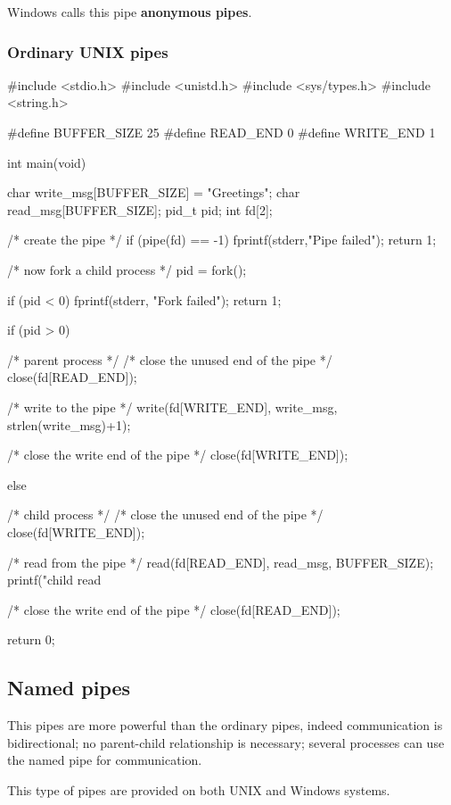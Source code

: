 Windows calls this pipe \textbf{anonymous pipes}.

\newpage
\subsubsection{Ordinary UNIX pipes}
\begin{codeInC}
#include <stdio.h>
#include <unistd.h>
#include <sys/types.h>
#include <string.h>

#define BUFFER_SIZE 25
#define READ_END	0
#define WRITE_END	1

int main(void){
	char write_msg[BUFFER_SIZE] = "Greetings";
	char read_msg[BUFFER_SIZE];
	pid_t pid;
	int fd[2];

	/* create the pipe */
	if (pipe(fd) == -1) {
		fprintf(stderr,"Pipe failed");
		return 1;
	}

	/* now fork a child process */
	pid = fork();

	if (pid < 0) {
		fprintf(stderr, "Fork failed");
		return 1;
	}

	if (pid > 0) {  /* parent process */
		/* close the unused end of the pipe */
		close(fd[READ_END]);

		/* write to the pipe */
		write(fd[WRITE_END], write_msg, strlen(write_msg)+1); 

		/* close the write end of the pipe */
		close(fd[WRITE_END]);
	}
	else { /* child process */
		/* close the unused end of the pipe */
		close(fd[WRITE_END]);

		/* read from the pipe */
		read(fd[READ_END], read_msg, BUFFER_SIZE);
		printf("child read %

		/* close the write end of the pipe */
		close(fd[READ_END]);
	}
	return 0;
}

\end{codeInC}

\newpage
\subsection{Named pipes}

This pipes are more powerful than the ordinary pipes, indeed communication is bidirectional; no parent-child relationship is necessary; several processes can use the named pipe for communication.

This type of pipes are provided on both UNIX and Windows systems.

